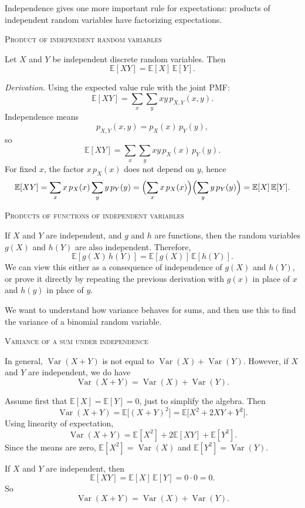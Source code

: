 Independence gives one more important rule for expectations: products of independent random variables have factorizing expectations.

\bigskip\textsc{Product of independent random variables}

Let \(X\) and \(Y\) be independent discrete random variables.  
Then
\[
\mathbb{E}[XY] = \mathbb{E}[X]\,\mathbb{E}[Y].
\]

\textit{Derivation.}  
Using the expected value rule with the joint PMF:
\[
\mathbb{E}[XY]
= \sum_{x} \sum_{y} xy\,p_{X,Y}(x,y).
\]
Independence means
\[
p_{X,Y}(x,y) = p_X(x)\,p_Y(y),
\]
so
\[
\mathbb{E}[XY]
= \sum_{x} \sum_{y} xy\,p_X(x)\,p_Y(y).
\]
For fixed \(x\), the factor \(x\,p_X(x)\) does not depend on \(y\), hence
\[
\mathbb{E}[XY]
= \sum_{x} x\,p_X(x) \sum_{y} y\,p_Y(y)
= \Bigl(\sum_{x} x\,p_X(x)\Bigr)
  \Bigl(\sum_{y} y\,p_Y(y)\Bigr)
= \mathbb{E}[X]\,\mathbb{E}[Y].
\]

\bigskip\textsc{Products of functions of independent variables}

If \(X\) and \(Y\) are independent, and \(g\) and \(h\) are functions, then the random variables \(g(X)\) and \(h(Y)\) are also independent.  
Therefore,
\[
\mathbb{E}[g(X)\,h(Y)]
= \mathbb{E}[g(X)]\,\mathbb{E}[h(Y)].
\]
We can view this either as a consequence of independence of \(g(X)\) and \(h(Y)\), or prove it directly by repeating the previous derivation with \(g(x)\) in place of \(x\) and \(h(y)\) in place of \(y\).


We want to understand how variance behaves for sums, and then use this to find the variance of a binomial random variable.

\newpage
\bigskip\textsc{Variance of a sum under independence}

In general, \(\operatorname{Var}(X+Y)\) is not equal to \(\operatorname{Var}(X)+\operatorname{Var}(Y)\).  
However, if \(X\) and \(Y\) are independent, we do have
\[
\operatorname{Var}(X+Y) = \operatorname{Var}(X) + \operatorname{Var}(Y).
\]

Assume first that \(\mathbb{E}[X]=\mathbb{E}[Y]=0\), just to simplify the algebra.  
Then
\[
\operatorname{Var}(X+Y)
= \mathbb{E}\bigl[(X+Y)^2\bigr]
= \mathbb{E}\bigl[X^2 + 2XY + Y^2\bigr].
\]
Using linearity of expectation,
\[
\operatorname{Var}(X+Y)
= \mathbb{E}[X^2] + 2\mathbb{E}[XY] + \mathbb{E}[Y^2].
\]
Since the means are zero, \(\mathbb{E}[X^2] = \operatorname{Var}(X)\) and \(\mathbb{E}[Y^2] = \operatorname{Var}(Y)\).  

If \(X\) and \(Y\) are independent, then
\[
\mathbb{E}[XY] = \mathbb{E}[X]\,\mathbb{E}[Y] = 0 \cdot 0 = 0.
\]
So
\[
\operatorname{Var}(X+Y)
= \operatorname{Var}(X) + \operatorname{Var}(Y).
\]

